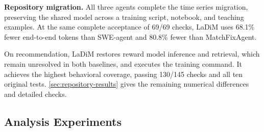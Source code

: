 \textbf{Repository migration.} All three agents complete the time series migration, preserving the shared model across a training script, notebook, and teaching examples. At the same complete acceptance of 69/69 checks, LaDiM uses 68.1\% fewer end-to-end tokens than SWE-agent and 80.8\% fewer than MatchFixAgent.

On recommendation, LaDiM restores reward model inference and retrieval, which remain unresolved in both baselines, and executes the training command. It achieves the highest behavioral coverage, passing 130/145 checks and all ten original tests. \cref{sec:repository-results} gives the remaining numerical differences and detailed checks.

\subsection{Analysis Experiments}
\label{sec:fault-characterization}

